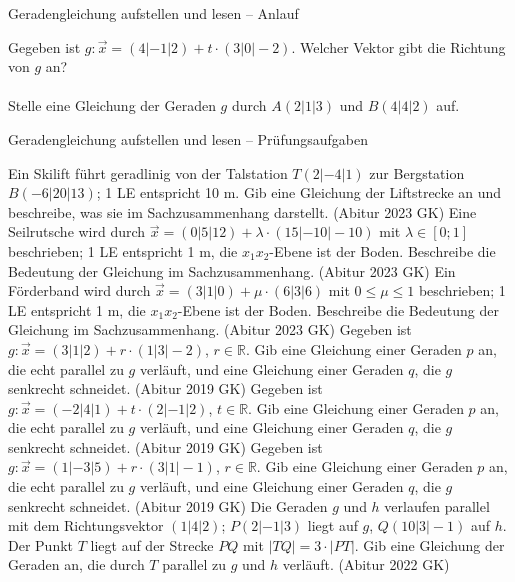 \setcounter{aufgabe}{25}

\begin{aufgabe}{Geradengleichung aufstellen und lesen – Anlauf}
\begin{teile}
\teil Gegeben ist $g\colon \vec x = (4 | -1 | 2) + t \cdot (3 | 0 | -2)$. Welcher Vektor gibt die Richtung von $g$ an?  \\  \\ 
\teil Stelle eine Gleichung der Geraden $g$ durch $A(2 | 1 | 3)$ und $B(4 | 4 | 2)$ auf.
\end{teile}
\end{aufgabe}

\begin{aufgabe}{Geradengleichung aufstellen und lesen – Prüfungsaufgaben}
\begin{teile}
\teil Ein Skilift führt geradlinig von der Talstation $T(2 | -4 | 1)$ zur Bergstation $B(-6 | 20 | 13)$; 1 LE entspricht 10 m. Gib eine Gleichung der Liftstrecke an und beschreibe, was sie im Sachzusammenhang darstellt. \hfill (Abitur 2023 GK)
\teil Eine Seilrutsche wird durch $\vec x = (0 | 5 | 12) + \lambda \cdot (15 | -10 | -10)$ mit $\lambda \in [0; 1]$ beschrieben; 1 LE entspricht 1 m, die $x_1x_2$-Ebene ist der Boden. Beschreibe die Bedeutung der Gleichung im Sachzusammenhang. \hfill (Abitur 2023 GK)
\teil Ein Förderband wird durch $\vec x = (3 | 1 | 0) + \mu \cdot (6 | 3 | 6)$ mit $0 \le \mu \le 1$ beschrieben; 1 LE entspricht 1 m, die $x_1x_2$-Ebene ist der Boden. Beschreibe die Bedeutung der Gleichung im Sachzusammenhang. \hfill (Abitur 2023 GK)
\teil Gegeben ist $g\colon \vec x = (3 | 1 | 2) + r \cdot (1 | 3 | -2)$, $r \in \mathbb{R}$. Gib eine Gleichung einer Geraden $p$ an, die echt parallel zu $g$ verläuft, und eine Gleichung einer Geraden $q$, die $g$ senkrecht schneidet. \hfill (Abitur 2019 GK)
\teil Gegeben ist $g\colon \vec x = (-2 | 4 | 1) + t \cdot (2 | -1 | 2)$, $t \in \mathbb{R}$. Gib eine Gleichung einer Geraden $p$ an, die echt parallel zu $g$ verläuft, und eine Gleichung einer Geraden $q$, die $g$ senkrecht schneidet. \hfill (Abitur 2019 GK)
\teil Gegeben ist $g\colon \vec x = (1 | -3 | 5) + r \cdot (3 | 1 | -1)$, $r \in \mathbb{R}$. Gib eine Gleichung einer Geraden $p$ an, die echt parallel zu $g$ verläuft, und eine Gleichung einer Geraden $q$, die $g$ senkrecht schneidet. \hfill (Abitur 2019 GK)
\teil Die Geraden $g$ und $h$ verlaufen parallel mit dem Richtungsvektor $(1 | 4 | 2)$; $P(2 | -1 | 3)$ liegt auf $g$, $Q(10 | 3 | -1)$ auf $h$. Der Punkt $T$ liegt auf der Strecke $PQ$ mit $|TQ| = 3 \cdot |PT|$. Gib eine Gleichung der Geraden an, die durch $T$ parallel zu $g$ und $h$ verläuft. \hfill (Abitur 2022 GK)

\end{teile}
\end{aufgabe}
